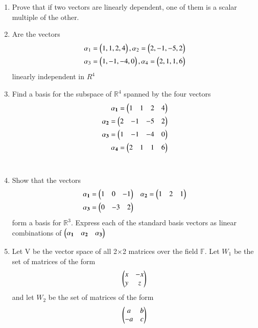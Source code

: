 \renewcommand{\theequation}{\theenumi}
\renewcommand{\thefigure}{\theenumi}
\begin{enumerate}[label=\thesubsection.\arabic*.,ref=\thesubsection.\theenumi]
\item Prove that if two vectors are linearly dependent, one of them is a scalar multiple of the other.
%
\\
\solution

%
\item Are the vectors 
\begin{align}
\alpha{_1}=\begin{pmatrix}1,1,2,4\end{pmatrix} , \alpha{_2}=\begin{pmatrix}2,-1,-5,2\end{pmatrix} \\
\alpha{_3}=\begin{pmatrix}1,-1,-4,0\end{pmatrix} , \alpha{_4}=\begin{pmatrix}2,1,1,6\end{pmatrix}
\end{align}
linearly independent in $R^{4}$
%
\\
\solution

%
\item Find a basis for the subspace of $\mathbb{R}^{4}$ spanned by the four vectors
\begin{align}
\mathbf{\alpha_1} = \begin{pmatrix}1&1&2&4\end{pmatrix}\\
\mathbf{\alpha_2} = \begin{pmatrix}2&-1&-5&2\end{pmatrix}\\
\mathbf{\alpha_3} = \begin{pmatrix}1&-1&-4&0\end{pmatrix}\\
\mathbf{\alpha_4} = \begin{pmatrix}2&1&1&6\end{pmatrix}
\end{align}
%
\\
\solution

\item Show that the vectors 
\begin{align}
& \mathbf{\alpha_1} = \begin{pmatrix}1 & 0 & -1\end{pmatrix} & \mathbf{\alpha_2} = \begin{pmatrix}1 & 2 & 1 \end{pmatrix} \\
& \mathbf{\alpha_3} = \begin{pmatrix}0 & -3 & 2\end{pmatrix}
\end{align}
form a basis for $\mathbb{R}^3$. Express each of the standard basis vectors as linear combinations
of $\begin{pmatrix}\mathbf{\alpha_1} &  \mathbf{\alpha_2} & \mathbf{\alpha_3}\end{pmatrix}$
\\
\solution
%
%
\item Let V be the vector space of all 2$\times$2 matrices over the field $\mathbb{F}$. Let $W_1$ be the set of matrices of the form 
\begin{align}
    \begin{pmatrix}x&-x\\y&z\end{pmatrix}
\end{align}
and let $W_2$ be the set of matrices of the form 
\begin{align}
    \myvec{a&b\\-a&c}

\end{align}
\end{enumerate}
